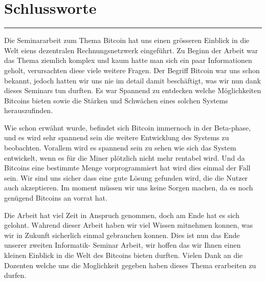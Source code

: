 \documentclass[a4paper, 11pt, DIV11, BCOR5mm]{scrartcl}
\begin{document}

\vspace*{1mm}
\section*{Schlussworte}
\vspace{-10mm}
\noindent\rule{0.8\textwidth}{0.4pt}

Die Seminararbeit zum Thema Bitcoin hat uns einen grösseren Einblick in die Welt eiens dezentralen Rechnungsnetzwerk eingeführt.
Zu Beginn der Arbeit war das Thema ziemlich komplex und kaum hatte man sich ein paar Informationen geholt, verursachten diese
viele weitere Fragen. Der Begriff Bitcoin war uns schon bekannt, jedoch hatten wir uns nie im detail damit beschäftigt, was wir
nun dank dieses Seminars tun durften. Es war Spannend zu entdecken welche Möglichkeiten Bitcoins bieten sowie die Stärken und
Schwächen eines solchen Systems herauszufinden.

\noindent
Wie schon erwähnt wurde, befindet sich Bitcoin immernoch in der Beta-phase, und es wird sehr spannend sein die weitere Entwicklung
des Systems zu beobachten. Vorallem wird es spannend sein zu sehen wie sich das System entwickelt, wenn es für die Miner plötzlich
nicht mehr rentabel wird. Und da Bitcoins eine bestimmte Menge vorprogrammiert hat wird dies einmal der Fall sein.
Wir sind uns sicher dass eine gute Lösung gefunden wird, die die Nutzer auch akzeptieren. Im moment müssen wir uns keine Sorgen machen,
da es noch genügend Bitcoins an vorrat hat.

\noindent
Die Arbeit hat viel Zeit in Anspruch genommen, doch am Ende hat es sich gelohnt.
Wahrend dieser Arbeit haben wir viel Wissen mitnehmen konnen, was wir in Zukunft
sicherlich einmal gebrauchen konnen. Dies ist nun das Ende unserer zweiten Informatik-
Seminar Arbeit, wir hoffen das wir Ihnen einen kleinen Einblick in die Welt des Bitcoins bieten durften.
Vielen Dank an die Dozenten welche uns die Moglichkeit gegeben haben dieses Thema erarbeiten zu durfen.


\nocite{*}
\newpage
{}


\end{document}
